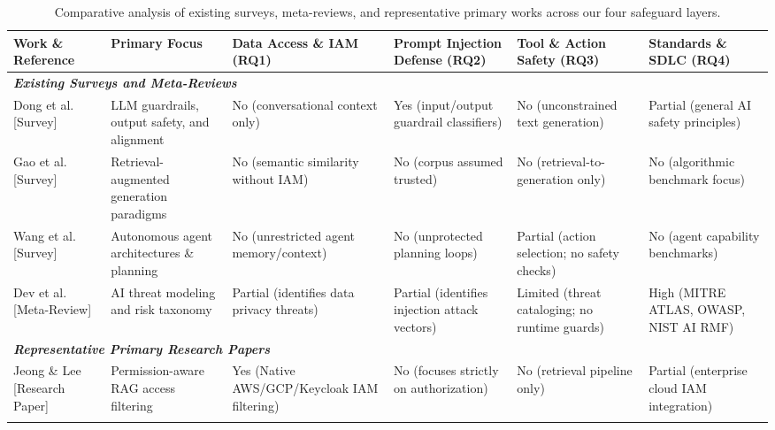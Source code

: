 \documentclass[sigconf]{acmart}
\begin{document}
\begin{table}[t]
\centering
\caption{Comparative analysis of existing surveys, meta-reviews, and representative primary works across our four safeguard layers.}
\label{tab:survey_comparison}
\small
\setlength{\tabcolsep}{3pt}
\begin{tabular}{p{2.7cm}p{3.2cm}p{2.4cm}p{2.5cm}p{2.6cm}p{2.4cm}}
\toprule
\textbf{Work \& Reference} & \textbf{Primary Focus} & \textbf{Data Access \& IAM (RQ1)} & \textbf{Prompt Injection Defense (RQ2)} & \textbf{Tool \& Action Safety (RQ3)} & \textbf{Standards \& SDLC (RQ4)} \\
\midrule
\multicolumn{6}{l}{\textit{\textbf{Existing Surveys and Meta-Reviews}}} \\
\midrule
Dong et al.~\cite{dong2025safeguardingsurvey} [Survey] & LLM guardrails, output safety, and alignment & No (conversational context only) & Yes (input/output guardrail classifiers) & No (unconstrained text generation) & Partial (general AI safety principles) \\
\addlinespace
Gao et al.~\cite{gao2023ragsurvey} [Survey] & Retrieval-augmented generation paradigms & No (semantic similarity without IAM) & No (corpus assumed trusted) & No (retrieval-to-generation only) & No (algorithmic benchmark focus) \\
\addlinespace
Wang et al.~\cite{wang2024agents} [Survey] & Autonomous agent architectures \& planning & No (unrestricted agent memory/context) & No (unprotected planning loops) & Partial (action selection; no safety checks) & No (agent capability benchmarks) \\
\addlinespace
Dev et al.~\cite{dev2025threat} [Meta-Review] & AI threat modeling and risk taxonomy & Partial (identifies data privacy threats) & Partial (identifies injection attack vectors) & Limited (threat cataloging; no runtime guards) & High (MITRE ATLAS, OWASP, NIST AI RMF) \\
\midrule
\multicolumn{6}{l}{\textit{\textbf{Representative Primary Research Papers}}} \\
\midrule
Jeong \& Lee~\cite{jeonglee2025permissionawarerag} [Research Paper] & Permission-aware RAG access filtering & Yes (Native AWS/GCP/Keycloak IAM filtering) & No (focuses strictly on authorization) & No (retrieval pipeline only) & Partial (enterprise cloud IAM integration) \\
\addlinespace

\end{tabular}
\end{table}
\end{document}
